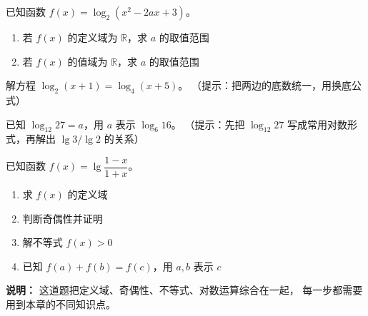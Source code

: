 \begin{exercise}[6]
已知函数 \(f(x) = \log_2 (x^2 - 2ax + 3)\)。
\begin{enumerate}
  \item[(1)] 若 \(f(x)\) 的定义域为 \(\mathbb{R}\)，求 \(a\) 的取值范围
  \item[(2)] 若 \(f(x)\) 的值域为 \(\mathbb{R}\)，求 \(a\) 的取值范围
\end{enumerate}

\end{exercise}


\begin{exercise}[6]
解方程 \(\log_2 (x+1) = \log_4 (x+5)\)。
（提示：把两边的底数统一，用换底公式）

\end{exercise}


\begin{exercise}[6]
已知 \(\log_{12} 27 = a\)，用 \(a\) 表示 \(\log_6 16\)。
（提示：先把 \(\log_{12} 27\) 写成常用对数形式，再解出 \(\lg 3 / \lg 2\) 的关系）


\end{exercise}


\begin{exercise}[7]
已知函数 \(f(x) = \lg \dfrac{1 - x}{1 + x}\)。
\begin{enumerate}
  \item[(1)] 求 \(f(x)\) 的定义域
  \item[(2)] 判断奇偶性并证明
  \item[(3)] 解不等式 \(f(x) > 0\)
  \item[(4)] 已知 \(f(a) + f(b) = f(c)\)，用 \(a, b\) 表示 \(c\)
\end{enumerate}

\textbf{说明：} 这道题把定义域、奇偶性、不等式、对数运算综合在一起，
每一步都需要用到本章的不同知识点。
\end{exercise}





